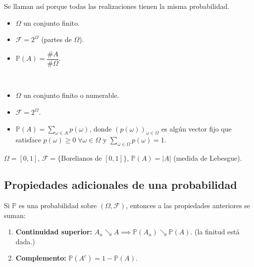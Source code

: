 \begin{eg}
    Se llaman así porque todas las realizaciones tienen la misma probabilidad.
    \begin{itemize}
        \item \(\Omega\) un conjunto finito.
        \item \(\mathcal{F} = 2^{\Omega}\) (partes de \(\Omega\)).
        \item \(\mathbb{P}(A) = \dfrac{\#A}{\#\Omega}\).
    \end{itemize}
\end{eg}

\begin{eg}~
    \begin{itemize}
        \item \(\Omega\) un conjunto finito o numerable.
        \item \(\mathcal{F} = 2^{\Omega}\).
        \item \(\mathbb{P}(A) = \sum_{\omega \in A} p(\omega)\), donde \((p(\omega))_{\omega \in \Omega}\) es algún vector fijo que satisface \(p(\omega) \geq 0 \; \forall \omega \in \Omega\) y \(\sum_{\omega \in \Omega} p(\omega) = 1\).
    \end{itemize}
\end{eg}

\begin{eg}
    \(\Omega = [0,1]\), \(\mathcal{F} = \{\text{Borelianos de } [0,1]\}\), \(\mathbb{P}(A) = |A|\) (medida de Lebesgue).
\end{eg}

\subsection{Propiedades adicionales de una probabilidad}
\begin{property}
	Si \(\mathbb{P}\) es una probabilidad sobre \((\Omega, \mathcal{F})\), entonces a las propiedades anteriores se suman:
	\begin{enumerate}
		\item[iv)] \textbf{Continuidad superior:} \(A_n \searrow A \implies \mathbb{P}(A_n) \searrow \mathbb{P}(A)\). (la finitud está dada.)

		\item[v)] \textbf{Complemento:} \(\mathbb{P}(A^c) = 1 - \mathbb{P}(A)\).
	\end{enumerate}
\end{property}

